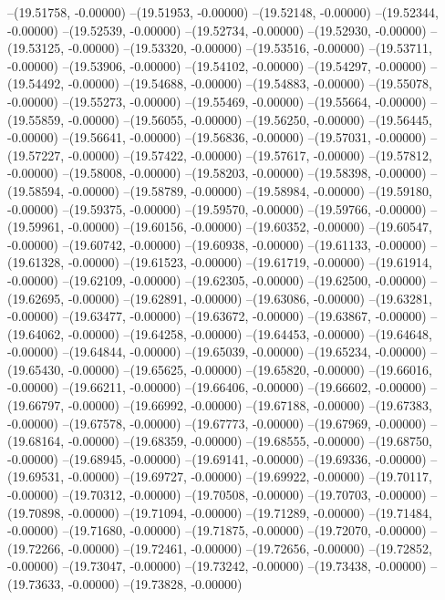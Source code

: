 --(19.51758, -0.00000)
--(19.51953, -0.00000)
--(19.52148, -0.00000)
--(19.52344, -0.00000)
--(19.52539, -0.00000)
--(19.52734, -0.00000)
--(19.52930, -0.00000)
--(19.53125, -0.00000)
--(19.53320, -0.00000)
--(19.53516, -0.00000)
--(19.53711, -0.00000)
--(19.53906, -0.00000)
--(19.54102, -0.00000)
--(19.54297, -0.00000)
--(19.54492, -0.00000)
--(19.54688, -0.00000)
--(19.54883, -0.00000)
--(19.55078, -0.00000)
--(19.55273, -0.00000)
--(19.55469, -0.00000)
--(19.55664, -0.00000)
--(19.55859, -0.00000)
--(19.56055, -0.00000)
--(19.56250, -0.00000)
--(19.56445, -0.00000)
--(19.56641, -0.00000)
--(19.56836, -0.00000)
--(19.57031, -0.00000)
--(19.57227, -0.00000)
--(19.57422, -0.00000)
--(19.57617, -0.00000)
--(19.57812, -0.00000)
--(19.58008, -0.00000)
--(19.58203, -0.00000)
--(19.58398, -0.00000)
--(19.58594, -0.00000)
--(19.58789, -0.00000)
--(19.58984, -0.00000)
--(19.59180, -0.00000)
--(19.59375, -0.00000)
--(19.59570, -0.00000)
--(19.59766, -0.00000)
--(19.59961, -0.00000)
--(19.60156, -0.00000)
--(19.60352, -0.00000)
--(19.60547, -0.00000)
--(19.60742, -0.00000)
--(19.60938, -0.00000)
--(19.61133, -0.00000)
--(19.61328, -0.00000)
--(19.61523, -0.00000)
--(19.61719, -0.00000)
--(19.61914, -0.00000)
--(19.62109, -0.00000)
--(19.62305, -0.00000)
--(19.62500, -0.00000)
--(19.62695, -0.00000)
--(19.62891, -0.00000)
--(19.63086, -0.00000)
--(19.63281, -0.00000)
--(19.63477, -0.00000)
--(19.63672, -0.00000)
--(19.63867, -0.00000)
--(19.64062, -0.00000)
--(19.64258, -0.00000)
--(19.64453, -0.00000)
--(19.64648, -0.00000)
--(19.64844, -0.00000)
--(19.65039, -0.00000)
--(19.65234, -0.00000)
--(19.65430, -0.00000)
--(19.65625, -0.00000)
--(19.65820, -0.00000)
--(19.66016, -0.00000)
--(19.66211, -0.00000)
--(19.66406, -0.00000)
--(19.66602, -0.00000)
--(19.66797, -0.00000)
--(19.66992, -0.00000)
--(19.67188, -0.00000)
--(19.67383, -0.00000)
--(19.67578, -0.00000)
--(19.67773, -0.00000)
--(19.67969, -0.00000)
--(19.68164, -0.00000)
--(19.68359, -0.00000)
--(19.68555, -0.00000)
--(19.68750, -0.00000)
--(19.68945, -0.00000)
--(19.69141, -0.00000)
--(19.69336, -0.00000)
--(19.69531, -0.00000)
--(19.69727, -0.00000)
--(19.69922, -0.00000)
--(19.70117, -0.00000)
--(19.70312, -0.00000)
--(19.70508, -0.00000)
--(19.70703, -0.00000)
--(19.70898, -0.00000)
--(19.71094, -0.00000)
--(19.71289, -0.00000)
--(19.71484, -0.00000)
--(19.71680, -0.00000)
--(19.71875, -0.00000)
--(19.72070, -0.00000)
--(19.72266, -0.00000)
--(19.72461, -0.00000)
--(19.72656, -0.00000)
--(19.72852, -0.00000)
--(19.73047, -0.00000)
--(19.73242, -0.00000)
--(19.73438, -0.00000)
--(19.73633, -0.00000)
--(19.73828, -0.00000)
